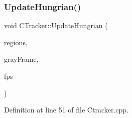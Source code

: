 \subsubsection{\texorpdfstring{Update\+Hungrian()}{UpdateHungrian()}}
{\footnotesize\ttfamily void C\+Tracker\+::\+Update\+Hungrian (\begin{DoxyParamCaption}\item[{const \mbox{\hyperlink{defines_8h_a01db0de56a20f4342820a093c5154536}{regions\+\_\+t}} \&}]{regions,  }\item[{cv\+::\+U\+Mat}]{gray\+Frame,  }\item[{float}]{fps }\end{DoxyParamCaption})\hspace{0.3cm}{\ttfamily [private]}}



Definition at line 51 of file Ctracker.\+cpp.


